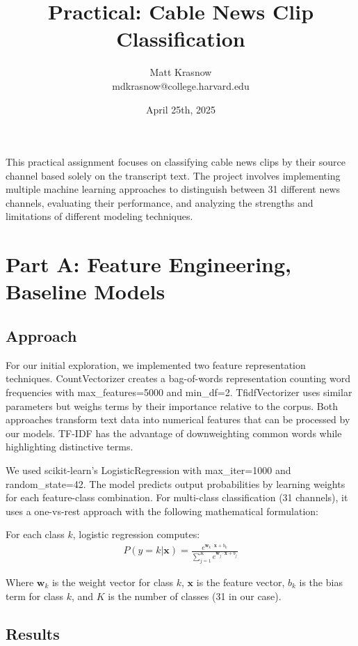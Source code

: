 \documentclass[11pt]{article}
\title{Practical: Cable News Clip Classification}
\author{Matt Krasnow \\ mdkrasnow@college.harvard.edu}
\date{April 25th, 2025}
\begin{document}
\maketitle{}


\noindent This practical assignment focuses on classifying cable news clips by their source channel based solely on the transcript text. The project involves implementing multiple machine learning approaches to distinguish between 31 different news channels, evaluating their performance, and analyzing the strengths and limitations of different modeling techniques.\\

\section{Part A: Feature Engineering, Baseline Models}

\subsection{Approach}

For our initial exploration, we implemented two feature representation techniques. CountVectorizer creates a bag-of-words representation counting word frequencies with max\_features=5000 and min\_df=2. TfidfVectorizer uses similar parameters but weighs terms by their importance relative to the corpus. Both approaches transform text data into numerical features that can be processed by our models. TF-IDF has the advantage of downweighting common words while highlighting distinctive terms. 

We used scikit-learn's LogisticRegression with max\_iter=1000 and random\_state=42. The model predicts output probabilities by learning weights for each feature-class combination. For multi-class classification (31 channels), it uses a one-vs-rest approach with the following mathematical formulation:

For each class $k$, logistic regression computes:
\begin{align}
P(y = k | \mathbf{x}) = \frac{e^{\mathbf{w}_k \cdot \mathbf{x} + b_k}}{\sum_{j=1}^{K} e^{\mathbf{w}_j \cdot \mathbf{x} + b_j}}
\end{align}

Where $\mathbf{w}_k$ is the weight vector for class $k$, $\mathbf{x}$ is the feature vector, $b_k$ is the bias term for class $k$, and $K$ is the number of classes (31 in our case).

\subsection{Results}
\end{document}
